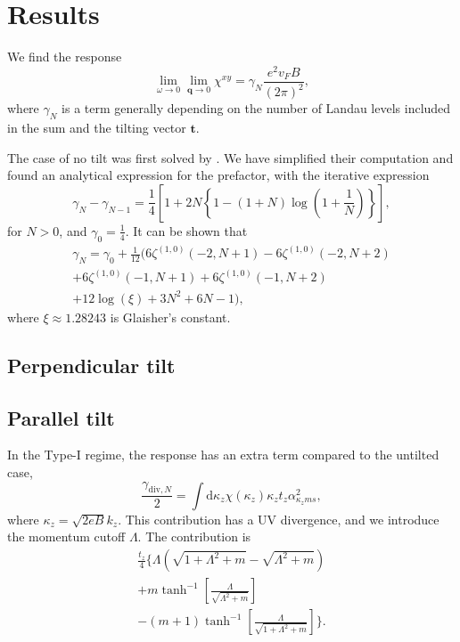 \documentclass[%
 reprint,
 amsmath,amssymb,
 aps,
]{revtex4-2}
\renewcommand\vec\bm  %
\begin{document}
\section{Results\label{sec:results}}
We find the response
\begin{equation}
  \label{eq:response-w-dimensions}
  \lim_{\omega \to 0} \lim_{\vec{q} \to 0}
  \chi^{xy} =
  \gamma_{N} \frac{e^2 v_F B}{(2\pi)^2},
\end{equation}
where \( \gamma_N \) is a term generally depending on the number of Landau levels included in the sum and the tilting vector \( \vec{t} \).

The case of no tilt was first solved by \textcite{arjonaFingerprintsConformalAnomaly2019}.
We have simplified their computation and found an analytical expression for the prefactor, with the iterative expression
\begin{equation}
  \label{eq:2}
  \gamma_{N} - \gamma_{N-1} = \frac{1}{4} \left[ 1 + 2 N \left\{ 1 - (1+N) \log \left(1 + \frac{1}{N}\right) \right\} \right],
\end{equation}
for \( N>0 \), and \( \gamma_0 = \frac{1}{4} \).
It can be shown that
\begin{multline}
  \label{eq:4}
  \gamma_N = \gamma_0 + \frac{1}{12} \Big(
    6 \zeta ^{(1,0)}(-2,N+1)
    -6 \zeta ^{(1,0)}(-2,N+2)\\
    +6 \zeta^{(1,0)}(-1,N+1)
    + 6 \zeta^{(1,0)}(-1,N+2)\\
    +12 \log (\xi)
    +3 N^2
    +6 N
    -1
  \Big),
\end{multline}
where \( \xi \approx  1.28243 \) is Glaisher's constant.

\subsection{Perpendicular tilt}

\subsection{Parallel tilt}
In the Type-I regime, the response has an extra term compared to the untilted case,
\begin{equation}
  \label{eq:5}
  \frac{\gamma_{\text{div}, N}}{2} = \int \mathrm{d} \kappa_z \chi(\kappa_z) \kappa_z t_z \alpha_{\kappa_z m s}^2,
\end{equation}
where \( \kappa_z = \sqrt{2 e B} k_{z} \).
This contribution has a UV divergence, and we introduce the momentum cutoff \( \Lambda \).
The contribution is
\begin{multline}
  \label{eq:6}
  \frac{t_z}{4}
  \Bigg\{
  \Lambda \left(\sqrt{1 + \Lambda^2 + m} - \sqrt{\Lambda^2 + m} \right)\\
  + m \tanh^{-1} \left[\frac{\Lambda}{\sqrt{\Lambda^2 + m} }\right]\\
  - (m+1) \tanh^{-1} \left[ \frac{\Lambda}{\sqrt{1 + \Lambda^2 + m }} \right]
  \Bigg\}.
\end{multline}
\end{document}
